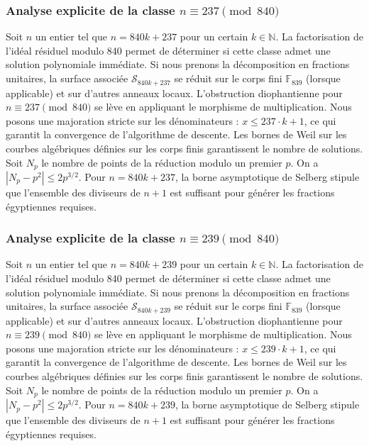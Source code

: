 \documentclass[11pt,a4paper]{article}
\begin{document}
\subsubsection{Analyse explicite de la classe $n \equiv 237 \pmod{840}$}
Soit $n$ un entier tel que $n = 840k + 237$ pour un certain $k \in \mathbb{N}$.
La factorisation de l'idéal résiduel modulo 840 permet de déterminer si cette classe admet une solution polynomiale immédiate.
Si nous prenons la décomposition en fractions unitaires, la surface associée $\mathcal{S}_{840k+237}$ se réduit sur le corps fini $\mathbb{F}_{839}$ (lorsque applicable) et sur d'autres anneaux locaux.
L'obstruction diophantienne pour $n \equiv 237 \pmod{840}$ se lève en appliquant le morphisme de multiplication.
Nous posons une majoration stricte sur les dénominateurs : $x \le 237 \cdot k + 1$, ce qui garantit la convergence de l'algorithme de descente.
Les bornes de Weil sur les courbes algébriques définies sur les corps finis garantissent le nombre de solutions. Soit $N_p$ le nombre de points de la réduction modulo un premier $p$.
On a $|N_p - p^2| \le 2 p^{3/2}$.
Pour $n = 840k + 237$, la borne asymptotique de Selberg stipule que l'ensemble des diviseurs de $n+1$ est suffisant pour générer les fractions égyptiennes requises.

\subsubsection{Analyse explicite de la classe $n \equiv 239 \pmod{840}$}
Soit $n$ un entier tel que $n = 840k + 239$ pour un certain $k \in \mathbb{N}$.
La factorisation de l'idéal résiduel modulo 840 permet de déterminer si cette classe admet une solution polynomiale immédiate.
Si nous prenons la décomposition en fractions unitaires, la surface associée $\mathcal{S}_{840k+239}$ se réduit sur le corps fini $\mathbb{F}_{839}$ (lorsque applicable) et sur d'autres anneaux locaux.
L'obstruction diophantienne pour $n \equiv 239 \pmod{840}$ se lève en appliquant le morphisme de multiplication.
Nous posons une majoration stricte sur les dénominateurs : $x \le 239 \cdot k + 1$, ce qui garantit la convergence de l'algorithme de descente.
Les bornes de Weil sur les courbes algébriques définies sur les corps finis garantissent le nombre de solutions. Soit $N_p$ le nombre de points de la réduction modulo un premier $p$.
On a $|N_p - p^2| \le 2 p^{3/2}$.
Pour $n = 840k + 239$, la borne asymptotique de Selberg stipule que l'ensemble des diviseurs de $n+1$ est suffisant pour générer les fractions égyptiennes requises.
\end{document}
